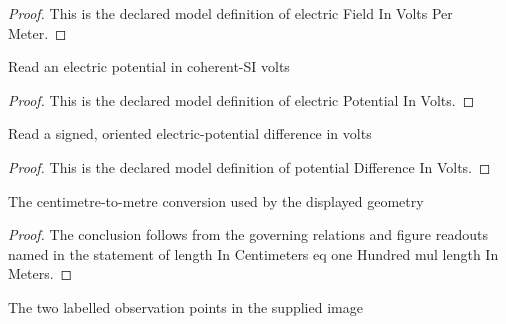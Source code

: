 \begin{proof}
  This is the declared model definition of electric Field In Volts Per Meter.
\end{proof}
\begin{definition}
  \label{def:physics:phyx-mini-0874:phyxminiproblems-problemphyxmini0874-electricpotentialinvolts}
  Read an electric potential in coherent-SI volts
\end{definition}
\begin{proof}
  This is the declared model definition of electric Potential In Volts.
\end{proof}
\begin{definition}
  \label{def:physics:phyx-mini-0874:phyxminiproblems-problemphyxmini0874-potentialdifferenceinvolts}
  Read a signed, oriented electric-potential difference in volts
\end{definition}
\begin{proof}
  This is the declared model definition of potential Difference In Volts.
\end{proof}
\begin{lemma}
  \label{lem:physics:phyx-mini-0874:phyxminiproblems-problemphyxmini0874-lengthincentimeters-eq-onehundred-mul-lengthinmeters}
  The centimetre-to-metre conversion used by the displayed geometry
\end{lemma}
\begin{proof}
  The conclusion follows from the governing relations and figure readouts named in the statement of length In Centimeters eq one Hundred mul length In Meters.
\end{proof}
\begin{definition}
  \label{def:physics:phyx-mini-0874:phyxminiproblems-problemphyxmini0874-diagrampoint}
  The two labelled observation points in the supplied image
\end{definition}
